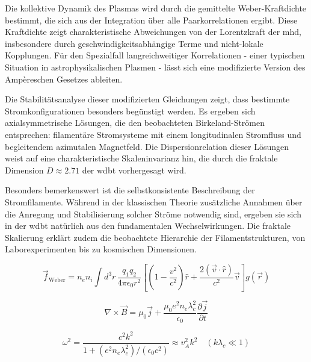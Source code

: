 Die kollektive Dynamik des Plasmas wird durch die gemittelte Weber-Kraftdichte bestimmt, die sich aus der Integration über alle Paarkorrelationen ergibt. Diese Kraftdichte zeigt
charakteristische Abweichungen von der Lorentzkraft der \gls{mhd}, insbesondere durch geschwindigkeitsabhängige Terme und nicht-lokale Kopplungen. Für den Spezialfall
langreichweitiger Korrelationen - einer typischen Situation in astrophysikalischen Plasmen - lässt sich eine modifizierte Version des Ampèreschen Gesetzes ableiten.

Die Stabilitätsanalyse dieser modifizierten Gleichungen zeigt, dass bestimmte Stromkonfigurationen besonders begünstigt werden. Es ergeben sich axialsymmetrische Lösungen, die
den beobachteten Birkeland-Strömen entsprechen: filamentäre Stromsysteme mit einem longitudinalen Stromfluss und begleitendem azimutalen Magnetfeld. Die Dispersionrelation dieser
Lösungen weist auf eine charakteristische Skaleninvarianz hin, die durch die fraktale Dimension $D \approx 2.71$ der \gls{wdbt} vorhergesagt wird.

Besonders bemerkenswert ist die selbstkonsistente Beschreibung der Stromfilamente. Während in der klassischen Theorie zusätzliche Annahmen über die Anregung und Stabilisierung
solcher Ströme notwendig sind, ergeben sie sich in der \gls{wdbt} natürlich aus den fundamentalen Wechselwirkungen. Die fraktale Skalierung erklärt zudem die beobachtete Hierarchie
der Filamentstrukturen, von Laborexperimenten bis zu kosmischen Dimensionen.

\begin{equation}
\label{eq:force_density}
\vec{f}_{\text{Weber}} = n_e n_i \int d^3r \, \frac{q_1 q_2}{4\pi\epsilon_0 r^2} 
\left[ \left(1 - \frac{v^2}{c^2}\right)\hat{r} + \frac{2(\vec{v}\cdot\hat{r})}{c^2}\vec{v} \right] g(\vec{r})
\end{equation}

\begin{equation}
\label{eq:birkeland_ampere}
\nabla \times \vec{B} = \mu_0 \vec{j} + \frac{\mu_0 e^2 n_e \lambda_c^2}{\epsilon_0} \frac{\partial \vec{j}}{\partial t}
\end{equation}

\begin{equation}
\omega^2 = \frac{c^2 k^2}{1 + (e^2 n_e \lambda_c^2)/(\epsilon_0 c^2)} \approx v_A^2 k^2 \quad (k\lambda_c \ll 1)
\end{equation}

